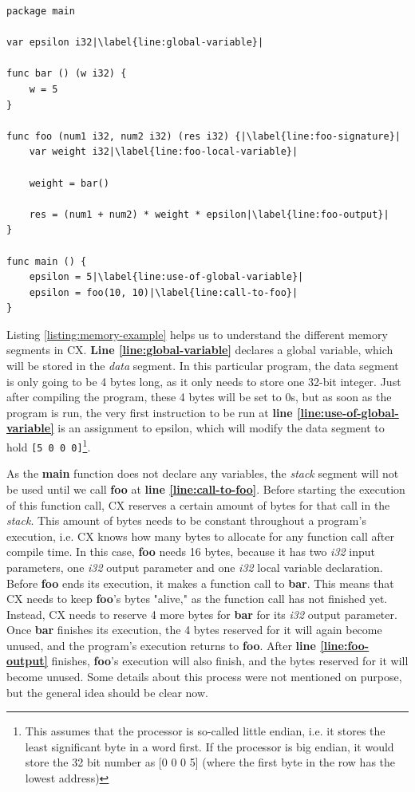 \documentclass[11pt,fleqn,openany]{book} %
\begin{document}
\begin{lstlisting}[caption={The use of different memory segments},captionpos=b,label={listing:memory-example}]
package main

var epsilon i32|\label{line:global-variable}|

func bar () (w i32) {
	w = 5
}

func foo (num1 i32, num2 i32) (res i32) {|\label{line:foo-signature}|
	var weight i32|\label{line:foo-local-variable}|

	weight = bar()

	res = (num1 + num2) * weight * epsilon|\label{line:foo-output}|
}

func main () {
	epsilon = 5|\label{line:use-of-global-variable}|
	epsilon = foo(10, 10)|\label{line:call-to-foo}|
}

\end{lstlisting}

Listing \ref{listing:memory-example} helps us to understand the different memory segments in CX. \textbf{Line \ref{line:global-variable}} declares a global variable, which will be stored in the \emph{data} segment. In this particular program, the data segment is only going to be 4 bytes long, as it only needs to store one 32-bit integer. Just after compiling the program, these 4 bytes will be set to 0s, but as soon as the program is run, the very first instruction to be run at \textbf{line \ref{line:use-of-global-variable}} is an assignment to epsilon, which will modify the data segment to hold \lstinline{[5 0 0 0]}\footnote{This assumes that the processor is so-called little endian, i.e. it stores the least significant byte in a word first.  If the processor is big endian, it would store the 32 bit number as [0 0 0 5] (where the first byte in the row has the lowest address)}.

As the \textbf{main} function does not declare any variables, the \emph{stack} segment will not be used until we call \textbf{foo} at \textbf{line \ref{line:call-to-foo}}. Before starting the execution of this function call, CX reserves a certain amount of bytes for that call in the \emph{stack}. This amount of bytes needs to be constant throughout a program's execution, i.e. CX knows how many bytes to allocate for any function call after compile time. In this case, \textbf{foo} needs 16 bytes, because it has two \emph{i32} input parameters, one \emph{i32} output parameter and one \emph{i32} local variable declaration. Before \textbf{foo} ends its execution, it makes a function call to \textbf{bar}. This means that CX needs to keep \textbf{foo}'s bytes "alive," as the function call has not finished yet. Instead, CX needs to reserve 4 more bytes for \textbf{bar} for its \emph{i32} output parameter. Once \textbf{bar} finishes its execution, the 4 bytes reserved for it will again become unused, and the program's execution returns to \textbf{foo}. After \textbf{line \ref{line:foo-output}} finishes, \textbf{foo}'s execution will also finish, and  the bytes reserved for it will become unused. Some details about this process were not mentioned on purpose, but the general idea should be clear now.
\end{document}
